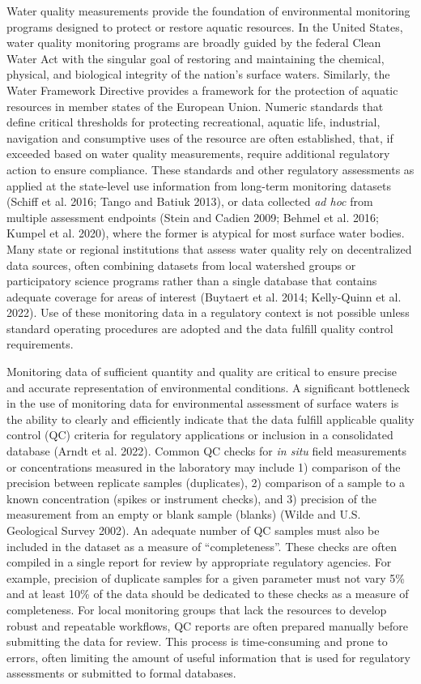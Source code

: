 Water quality measurements provide the foundation of environmental monitoring programs designed to protect or restore aquatic resources. In the United States, water quality monitoring programs are broadly guided by the federal Clean Water Act with the singular goal of restoring and maintaining the chemical, physical, and biological integrity of the nation's surface waters. Similarly, the Water Framework Directive provides a framework for the protection of aquatic resources in member states of the European Union. Numeric standards that define critical thresholds for protecting recreational, aquatic life, industrial, navigation and consumptive uses of the resource are often established, that, if exceeded based on water quality measurements, require additional regulatory action to ensure compliance. These standards and other regulatory assessments as applied at the state-level use information from long-term monitoring datasets (Schiff et al. 2016; Tango and Batiuk 2013), or data collected \emph{ad hoc} from multiple assessment endpoints (Stein and Cadien 2009; Behmel et al. 2016; Kumpel et al. 2020), where the former is atypical for most surface water bodies. Many state or regional institutions that assess water quality rely on decentralized data sources, often combining datasets from local watershed groups or participatory science programs rather than a single database that contains adequate coverage for areas of interest (Buytaert et al. 2014; Kelly-Quinn et al. 2022). Use of these monitoring data in a regulatory context is not possible unless standard operating procedures are adopted and the data fulfill quality control requirements.

Monitoring data of sufficient quantity and quality are critical to ensure precise and accurate representation of environmental conditions. A significant bottleneck in the use of monitoring data for environmental assessment of surface waters is the ability to clearly and efficiently indicate that the data fulfill applicable quality control (QC) criteria for regulatory applications or inclusion in a consolidated database (Arndt et al. 2022). Common QC checks for \emph{in situ} field measurements or concentrations measured in the laboratory may include 1) comparison of the precision between replicate samples (duplicates), 2) comparison of a sample to a known concentration (spikes or instrument checks), and 3) precision of the measurement from an empty or blank sample (blanks) (Wilde and U.S. Geological Survey 2002). An adequate number of QC samples must also be included in the dataset as a measure of ``completeness''. These checks are often compiled in a single report for review by appropriate regulatory agencies. For example, precision of duplicate samples for a given parameter must not vary 5\% and at least 10\% of the data should be dedicated to these checks as a measure of completeness. For local monitoring groups that lack the resources to develop robust and repeatable workflows, QC reports are often prepared manually before submitting the data for review. This process is time-consuming and prone to errors, often limiting the amount of useful information that is used for regulatory assessments or submitted to formal databases.

